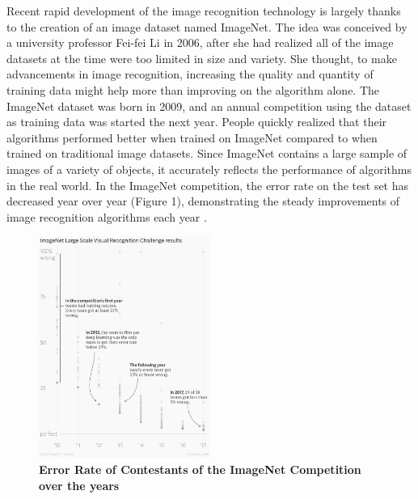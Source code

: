 \documentclass[letterpaper]{article} %
\begin{document}
Recent rapid development of the image recognition technology is largely thanks to the creation of an image dataset named ImageNet. The idea was conceived by a university professor Fei-fei Li in 2006, after she had realized all of the image datasets at the time were too limited in size and variety. She thought, to make advancements in image recognition, increasing the quality and quantity of training data might help more than improving on the algorithm alone. The ImageNet dataset was born in 2009, and an annual competition using the dataset as training data was started the next year. People quickly realized that their algorithms performed better when trained on ImageNet compared to when trained on traditional image datasets. Since ImageNet contains a large sample of images of a variety of objects, it accurately reflects the performance of algorithms in the real world. In the ImageNet competition, the error rate on the test set has decreased year over year (Figure 1), demonstrating the steady improvements of image recognition algorithms each year \cite{quartz2017image}. 

\begin{figure}[h!]
 \centering
  \includegraphics[width=0.5\textwidth]{intro.png}
 \caption{\textbf{Error Rate of Contestants of the ImageNet Competition over the years}}
 \label{fig:ErrorRate}
 \end{figure}
\end{document}
